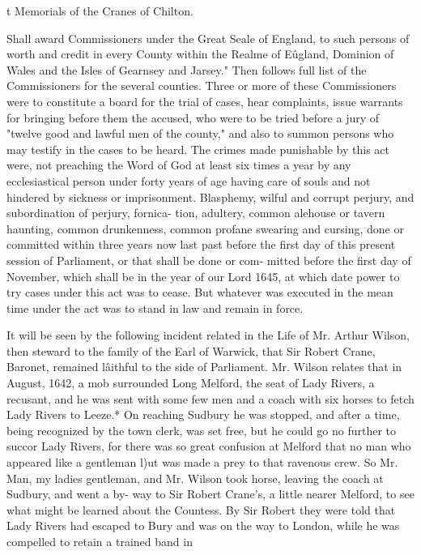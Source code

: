 \documentclass{book}
\begin{document}
t Memorials of the Cranes of Chilton. 




Shall award Commissioners under the Great Seale of England, 
to such persons of worth and credit in every County within the 
Realme of E\^ugland, Dominion of Wales and the Isles of Gearnsey 
and Jarsey." Then follows full list of the Commissioners for the 
several counties. Three or more of these Commissioners were to 
constitute a board for the trial of cases, hear complaints, issue 
warrants for bringing before them the accused, who were to be 
tried before a jury of "twelve good and lawful men of the 
county," and also to summon persons who may testify in the 
cases to be heard. The crimes made punishable by this act were, 
not preaching the Word of God at least six times a year by any 
ecclesiastical person under forty years of age having care of souls 
and not hindered by sickness or imprisonment. Blasphemy, 
wilful and corrupt perjury, and subordination of perjury, fornica- 
tion, adultery, common alehouse or tavern haunting, common 
drunkenness, common profane swearing and cursing, done or 
committed within three years now last past before the first day of 
this present session of Parliament, or that shall be done or com- 
mitted before the first day of November, which shall be in the 
year of our Lord 1645, at which date power to try cases under 
this act was to cease. But whatever was executed in the mean 
time under the act was to stand in law and remain in force. 

It will be seen by the following incident related in the Life of 
Mr. Arthur Wilson, then steward to the family of the Earl of 
Warwick, that Sir Robert Crane, Baronet, remained l\^aithful to 
the side of Parliament. Mr. Wilson relates that in August, 1642, 
a mob surrounded Long Melford, the seat of Lady Rivers, a 
recusant, and he was sent with some few men and a coach with 
six horses to fetch Lady Rivers to Leeze.* On reaching Sudbury 
he was stopped, and after a time, being recognized by the town 
clerk, was set free, but he could go no further to succor Lady 
Rivers, for there was so great confusion at Melford that no man 
who appeared like a gentleman l)ut was made a prey to that 
ravenous crew. So Mr. Man, my ladies gentleman, and Mr. 
Wilson took horse, leaving the coach at Sudbury, and went a by- 
way to Sir Robert Crane's, a little nearer Melford, to see what 
might be learned about the Countess. By Sir Robert they were 
told that Lady Rivers had escaped to Bury and was on the way 
to London, while he was compelled to retain a trained band in 
\end{document}
